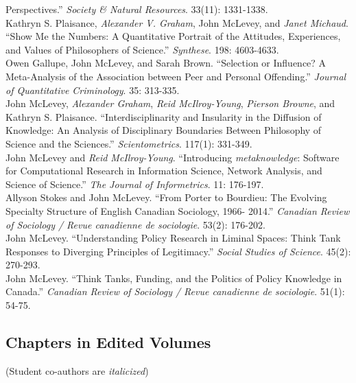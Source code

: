 \documentclass[11pt, a4paper]{article}
\newcommand{\note}[1]{\marginnote{\scriptsize #1}}
\begin{document}
Perspectives.'' \emph{Society \& Natural Resources}. 33(11): 1331-1338. 
  \\[.2cm]
  \note{2019}Kathryn S. Plaisance, \emph{Alexander V. Graham}, John
McLevey, and \emph{Janet Michaud}. ``Show Me the Numbers: A Quantitative
Portrait of the Attitudes, Experiences, and Values of Philosophers of
Science.'' \emph{Synthese}. 198: 4603-4633. 
  \\[.2cm]
  \note{2018}Owen Gallupe, John McLevey, and Sarah Brown. ``Selection or
Influence? A Meta-Analysis of the Association between Peer and Personal
Offending.'' \emph{Journal of Quantitative Criminology}. 35: 313-335. 
  \\[.2cm]
  \note{2018}John McLevey, \emph{Alexander Graham}, \emph{Reid
McIlroy-Young}, \emph{Pierson Browne}, and Kathryn S.
Plaisance. ``Interdisciplinarity and Insularity in the Diffusion of
Knowledge: An Analysis of Disciplinary Boundaries Between Philosophy of
Science and the Sciences.'' \emph{Scientometrics}. 117(1): 331-349. 
  \\[.2cm]
  \note{2017}John McLevey and \emph{Reid McIlroy-Young}. ``Introducing
\emph{metaknowledge}: Software for Computational Research in Information
Science, Network Analysis, and Science of Science.'' \emph{The Journal
of Informetrics}. 11: 176-197. 
  \\[.2cm]
  \note{2016}Allyson Stokes and John McLevey. ``From Porter to Bourdieu:
The Evolving Specialty Structure of English Canadian Sociology, 1966-
2014.'' \emph{Canadian Review of Sociology / Revue canadienne de
sociologie}. 53(2): 176-202. 
  \\[.2cm]
  \note{2015}John McLevey. ``Understanding Policy Research in Liminal
Spaces: Think Tank Responses to Diverging Principles of
Legitimacy.'' \emph{Social Studies of Science}. 45(2): 270-293. 
  \\[.2cm]
  \note{2014}John McLevey. ``Think Tanks, Funding, and the Politics of
Policy Knowledge in Canada.'' \emph{Canadian Review of Sociology / Revue
canadienne de sociologie}. 51(1): 54-75. 
  \\[.2cm]

\subsection*{Chapters in Edited Volumes}
(Student co-authors are \emph{italicized})\\
\end{document}

